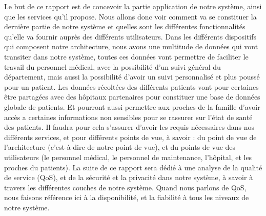 Le but de ce rapport est de concevoir la partie application de notre système, ainsi que les services qu’il propose. Nous allons
donc voir comment va se constituer la dernière partie de notre système et quelles sont les différentes fonctionnalités qu’elle va
fournir auprès des différents utilisateurs. Dans les différents dispositifs qui composent notre architecture, nous avons une
multitude de données qui vont transiter dans notre système, toutes ces données vont permettre de faciliter le travail du personnel
médical, avec la possibilité d’un suivi général du département, mais aussi la possibilité d’avoir un suivi personnalisé et plus
poussé pour un patient. Les données récoltées des différents patients vont pour certaines être partagées avec des hôpitaux
partenaires pour constituer une base de données globale de patients. Et pourront aussi permettre aux proches de la famille d’avoir
accès a certaines informations non sensibles pour se rassurer sur l'état de santé des patients. Il faudra pour cela s’assurer
d’avoir les requis nécessaires dans nos différents services, et pour différents points de vue, à savoir : du point de vue de
l’architecture (c’est-à-dire de notre point de vue), et du points de vue des utilisateurs (le personnel médical, le personnel de
maintenance, l’hôpital, et les proches du patients). La suite de ce rapport sera dédié à une analyse de la qualité de service
(QoS), et de la sécurité et la privacité dans notre système, à savoir à travers les différentes couches de notre système. Quand
nous parlons de QoS, nous faisons référence ici à la disponibilité, et la fiabilité à tous les niveaux de notre système. 